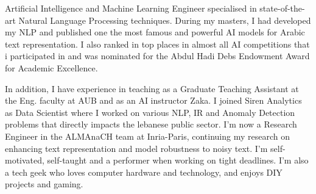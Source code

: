 

\begin{cvparagraph}


Artificial Intelligence and Machine Learning Engineer specialised in state-of-the-art Natural Language Processing techniques. 
During my masters, I had developed my NLP and published one the most famous and powerful AI models for Arabic text representation. 
I also ranked in top places in almost all AI competitions that i participated in and was nominated for the Abdul Hadi Debs Endowment Award for Academic Excellence.

In addition, I have experience in teaching as a Graduate Teaching Assistant at the Eng. faculty at AUB and as an AI instructor Zaka. 
I joined Siren Analytics as Data Scientist where I worked on various NLP, IR and Anomaly Detection problems that directly impacts the lebanese public sector. 
I'm now a Research Engineer in the ALMAnaCH team at Inria-Paris, continuing my research on enhancing text representation and model robustness to noisy text. 
I’m self-motivated, self-taught and a performer when working on tight deadlines. 
I’m also a tech geek who loves computer hardware and technology, and enjoys DIY projects and gaming.




\end{cvparagraph}
